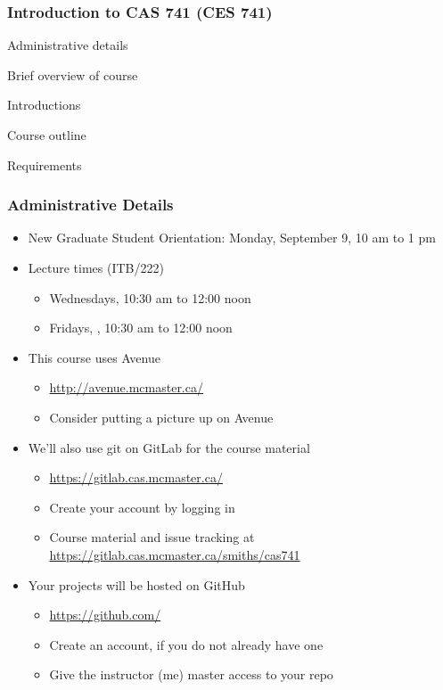 \documentclass[t,12pt,numbers,fleqn]{beamer}
\begin{document}




\begin{frame}
\frametitle{Introduction to CAS 741 (CES 741)}

\bi
\item Administrative details
\item Brief overview of course
\item Introductions
\item Course outline
\item Requirements
\ei
\end{frame}


\begin{frame}
\frametitle{Administrative Details}

\begin{itemize}

\item New Graduate Student Orientation: Monday, September 9, 10 am to 1 pm %
\item Lecture times (ITB/222)
\begin{itemize}
\item Wednesdays, 10:30 am to 12:00 noon
\item Fridays, , 10:30 am to 12:00 noon
\end{itemize}
\item This course uses Avenue
\begin{itemize}
\item \url{http://avenue.mcmaster.ca/} 
\item Consider putting a picture up on Avenue
\end{itemize}
\item We'll also use git on GitLab for the course material
\begin{itemize}
\item \url{https://gitlab.cas.mcmaster.ca/}
\item Create your account by logging in
\item Course material and issue tracking at \url{https://gitlab.cas.mcmaster.ca/smiths/cas741}
\end{itemize}
\item Your projects will be hosted on GitHub
\begin{itemize}
\item \url{https://github.com/}
\item Create an account, if you do not already have one
\item Give the instructor (me) master access to your repo
\end{itemize}

\end{itemize}

\end{frame}
\end{document}
